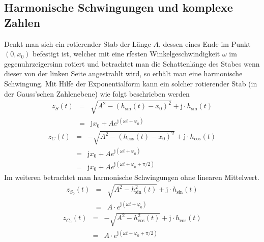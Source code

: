 \subsection{Harmonische Schwingungen und komplexe Zahlen}
Denkt man sich ein rotierender Stab der Länge $A$, dessen eines Ende im Punkt $\left(0,x_0\right)$ befestigt ist, welcher mit eine rfesten Winkelgeschwindigkeit $\omega$ im gegenuhrzeigersinn rotiert und betrachtet man die Schattenlänge des Stabes wenn dieser von der linken Seite angestrahlt wird, so erhält man eine harmonische Schwingung.
\newline\newline
Mit Hilfe der Exponentialform kann ein solcher rotierender Stab (in der Gauss'schen Zahlenebene) wie folgt beschrieben werden
\begin{equation}
\boxed{
\begin{array}{lll}
z_S\left(t\right)&=&\sqrt{A^2-\left(h_{\text{sin}}\left(t\right)-x_0\right)^2}+\text{j}\cdot h_{\text{sin}}\left(t\right)\\
&=&\text{j}x_0+Ae^{\text{j}\left(\omega t+\varphi_0\right)}
\end{array}
}
\end{equation}
\begin{equation}
\boxed{
\begin{array}{lll}
z_C\left(t\right)&=&-\sqrt{A^2-\left(h_{\text{cos}}\left(t\right)-x_0\right)^2}+\text{j}\cdot h_{\text{cos}}\left(t\right)\\
&=&\text{j}x_0+Ae^{\text{j}\left(\omega t+\varphi_0\right)}\\
&=&\text{j}x_0+Ae^{\text{j}\left(\omega t+\varphi_0+\pi/2\right)}
\end{array}
}
\end{equation}
Im weiteren betrachtet man harmonische Schwingungen ohne linearen Mittelwert.
\begin{equation}
\boxed{
\begin{array}{lll}
z_{S_0}\left(t\right)&=&\sqrt{A^2-h^2_{\text{sin}}\left(t\right)}+\text{j}\cdot h_{\text{sin}}\left(t\right)\\
&=&A\cdot e^{\text{j}\left(\omega t+\varphi_0\right)}
\end{array}
}
\end{equation}
\begin{equation}
\boxed{
\begin{array}{lll}
z_{C_0}\left(t\right)&=&-\sqrt{A^2-h^2_{\text{cos}}\left(t\right)}+\text{j}\cdot h_{\text{cos}}\left(t\right)\\
&=&A\cdot e^{\text{j}\left(\omega t+\varphi_0+\pi/2\right)}
\end{array}
}
\end{equation}
